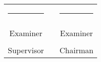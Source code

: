 %
\begin{center}
	\begin{tabular}{ccc}
		\rule{60mm}{0pt}        & \rule{10mm}{0pt}       & \rule{60mm}{0pt} \\
		\dotfill                &                        & \dotfill \\
		Examiner                &					     & Examiner \vspace{2cm} \\
		\dotfill                &                        & \dotfill \\
		Supervisor              &                        & Chairman \vspace{2cm} \\
	\end{tabular}    
\end{center}

